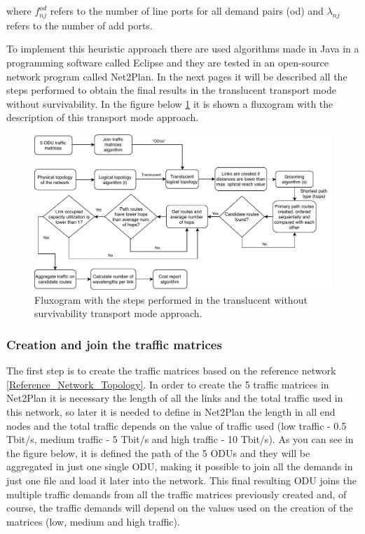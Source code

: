 \vspace{11pt}
\noindent
where $f_{nj}^{od}$ refers to the number of line ports for all demand pairs (od) and $\lambda_{nj}$ refers to the number of add ports.

\vspace{11pt}
To implement this heuristic approach there are used algorithms made in Java in a programming software called Eclipse and they are tested in an open-source network program called Net2Plan. In the next pages it will be described all the steps performed to obtain the final results in the translucent transport mode without survivability. In the figure below \ref{fluxogram_transl_surv} it is shown a fluxogram with the description of this transport mode approach.

\begin{figure}[h!]
\centering
\includegraphics[width=15cm]{sdf/heuristic/translucent_survivability/figures/fluxogram_translucent_surv}
\caption{Fluxogram with the steps performed in the translucent without survivability transport mode approach.}
\label{fluxogram_transl_surv}
\end{figure}

\subsubsection{Creation and join the traffic matrices}

\noindent
The first step is to create the traffic matrices based on the reference network \ref{Reference_Network_Topology}. In order to create the 5 traffic matrices in Net2Plan it is necessary the length of all the links and the total traffic used in this network, so later it is needed to define in Net2Plan the length in all end nodes and the total traffic depends on the value of traffic used (low traffic - 0.5 Tbit/s, medium traffic - 5 Tbit/s and high traffic - 10 Tbit/s). As you can see in the figure below, it is defined the path of the 5 ODUs and they will be aggregated in just one single ODU, making it possible to join all the demands in just one file and load it later into the network. This final resulting ODU joins the multiple traffic demands from all the traffic matrices previously created and, of course, the traffic demands will depend on the values used on the creation of the matrices (low, medium and high traffic).

